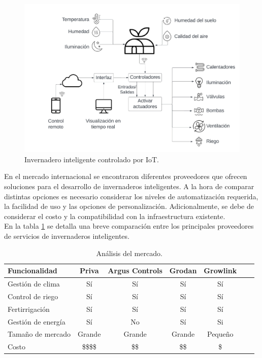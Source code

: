 \begin{figure}[htpb]
\centering 
\includegraphics[width=.7\textwidth]{../Figures/SmartGreenhouse.jpeg}
\caption{Invernadero inteligente controlado por IoT\protect\footnotemark.}
\label{fig:imgInvernaderoInteligente}
\end{figure}





En el mercado internacional se encontraron diferentes proveedores que ofrecen soluciones para el desarrollo de invernaderos inteligentes. A la hora de comparar distintas opciones es necesario considerar los niveles de automatización requerida, la facilidad de uso y las opciones de personalización. Adicionalmente, se debe de considerar el costo y la compatibilidad con la infraestructura existente. \\

En la tabla \ref{tab:vendors} se detalla una breve comparación entre los principales proveedores de servicios de invernaderos inteligentes. 




\begin{table}[h]
\centering
\caption[Análisis del estado del arte]{Análisis del mercado.}

\begin{tabular}{lcccccc} 
\toprule
\textbf{Funcionalidad} & \textbf{Priva \citep{priva}}  & \textbf{Argus Controls \citep{arguscontrol}} &\textbf{Grodan \citep{grodan}} & \textbf{Growlink \citep{growlink}}\\

\midrule
Gestión de clima   & Sí & Sí & Sí & Sí \\
Control de riego   & Sí & Sí & Sí & Sí \\
Fertirrigación     & Sí & Sí & Sí & Sí \\
Gestión de energía & Sí & No & Sí & Si \\
Tamaño de mercado  & Grande &  Grande & Grande & Pequeño \\
Costo              & \$\$\$\$ &  \$\$ & \$\$ &  \$ \\
\bottomrule
\hline
\end{tabular}
\label{tab:vendors}
\end{table}


